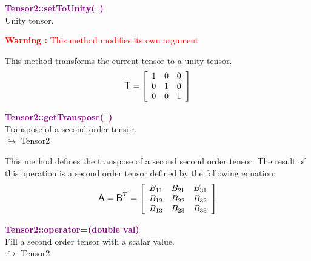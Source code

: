 \textcolor{purple}{\textbf{Tensor2::setToUnity(~)}}\label{Tensor2::setToUnity()}\\
Unity tensor.

\hspace*{10mm}\textcolor{red}{\textbf{Warning :} This method modifies its own argument}

This method transforms the current tensor to a unity tensor.
\begin{equation*}
\mbox{\large\ensuremath{\mathsf{T}}}=\left[\begin{array}{ccc}
1&0&0\\
0&1&0\\
0&0&1
\end{array}\right]
\end{equation*}

\textcolor{purple}{\textbf{Tensor2::getTranspose(~)}}\label{Tensor2::getTranspose()}\\
Transpose of a second order tensor.\\ \hspace*{10mm}$\hookrightarrow$ Tensor2

This method defines the transpose of a second second order tensor.
The result of this operation is a second order tensor defined by the following equation:
\begin{equation*}
\mbox{\large\ensuremath{\mathsf{A}}}=\mbox{\large\ensuremath{\mathsf{B}}}^T =\left[\begin{array}{ccc}
  B_{11} & B_{21} & B_{31}\\
  B_{12} & B_{22} & B_{32}\\
  B_{13} & B_{23} & B_{33}
  \end{array}\right]
\end{equation*}

\textcolor{purple}{\textbf{Tensor2::operator=(double val)}}\label{Tensor2::operator=(double val)}\\
Fill a second order tensor with a scalar value.\\ \hspace*{10mm}$\hookrightarrow$ Tensor2

